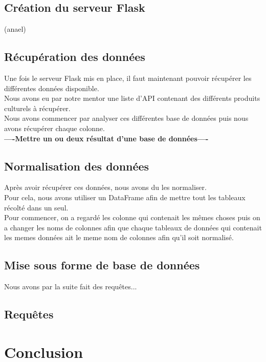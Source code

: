 \documentclass{article} %
\begin{document}
\subsection{Création du serveur Flask}
(anael)

\subsection{Récupération des données}
Une fois le serveur Flask mis en place, il faut maintenant pouvoir récupérer les différentes données disponible.\\
Nous avons eu par notre mentor une liste d'API contenant des différents produits culturels à récupérer.\\
Nous avons commencer par analyser ces différentes base de données puis nous avons récupérer chaque colonne.\\
\textbf{----Mettre un ou deux résultat d'une base de données----}

\subsection{Normalisation des données}
Après avoir récupérer ces données, nous avons du les normaliser.\\
Pour cela, nous avons utiliser un DataFrame afin de mettre tout les tableaux récolté dans un seul.\\
Pour commencer, on a regardé les colonne qui contenait les mêmes choses puis on a changer les noms de colonnes afin que chaque tableaux de données qui contenait les memes données ait le meme nom de colonnes afin qu'il soit normalisé.


\subsection{Mise sous forme de base de données}
Nous avons par la suite fait des requêtes...

\subsection{Requêtes}

\section{Conclusion}
\end{document}
